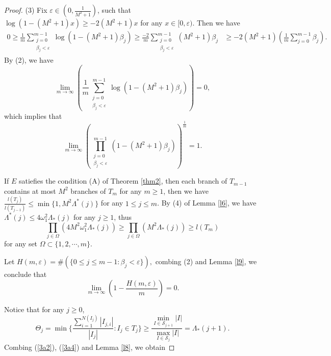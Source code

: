 \documentclass[10pt,a4paper]{amsart}
\begin{document}
\begin{proof}
(3) Fix $\varepsilon \in(0,\frac{1}{M^2+1} )$, such that $\log(1-(M^2+1)x)\ge -2(M^2+1)x$
for any $x\in[0,\varepsilon)$.
Then we have
\begin{equation*}
\begin{aligned}
0\ge \frac{1}{m} \sum_{\substack{j = 0\\\beta_j<\varepsilon }}^{m-1}\log(1-(M^2+1)\beta_j)\ge\frac{-2}{m} \sum_{\substack{j = 0\\\beta_j<\varepsilon }}^{m-1}(M^2+1)\beta_j&\ge
 -2(M^2+1)(\frac{1}{m}\sum_{j=0}^{m-1}\beta_j ).
\end{aligned}
\end{equation*}
By (2),
we have
\begin{equation*}
\lim_{m \to \infty} (\frac{1}{m} \sum_{\substack{j = 0\\\beta_j<\varepsilon }}^{m-1}\log(1-(M^2+1)\beta_j))=0,
\end{equation*}
which implies that
\begin{equation}\label{3a1}
\lim_{m \to \infty} ( \prod_{\substack{j = 0\\\beta_j<\varepsilon }}^{m-1}(1-(M^2+1)\beta_j))^{\frac{1}{m} }=1.
\end{equation}


If $E$ satiefies the condition {\rm(A)} of Theorem {\rm\ref{thm2}}, then each branch of $T_{m-1}$ contains at most $M^{2}$ branches of $T_{m}$ for any $m\ge1$, then we have $\frac{l(T_j) }{l(T_{j-1})}\le \min\{1,M^2\Lambda ^*(j)\}$ for any $1\le j \le m$. By (4) of Lemma \ref{l6}, we have $\Lambda^*(j)\le4\omega_1^2\Lambda_*(j)$ for any $j\ge 1$,
thus
\begin{equation}\label{3a2}
\prod_{j\in\Omega } (4M^2\omega_1^2\Lambda_*(j))\ge \prod_{j\in\Omega } (M^2\Lambda_*(j))\ge l(T_m)
\end{equation}
for any set $\Omega \subset \{1,2,\cdots,m\}$.


Let $H(m,\varepsilon)=\# (\{0\le j \le m-1:\beta_j<\varepsilon\}),$ combing (2) and Lemma \ref{l9}, we conclude that
\begin{equation}\label{3a3}
\lim_{m \to \infty} (1-\frac{H(m,\varepsilon )}{m}) =0.
\end{equation}

Notice that  for any $j\ge 0$, \begin{equation}\label{3a4}
\Theta_j=\min\{\frac{\sum_{i=1}^{N(I_j) }\left | I_{j,i} \right | }{\left | I_j \right | }: I_j\in T_j \}\ge \frac{\min_{I\in \mathcal{S}_{j+1} }\left | I \right | }{\max_{I\in \mathcal{S}_{j} }\left | I \right |}=\Lambda_*(j+1).
\end{equation}
Combing (\ref{3a2}), (\ref{3a4}) and Lemma \ref{l8}, we obtain



\end{proof}
\end{document}
